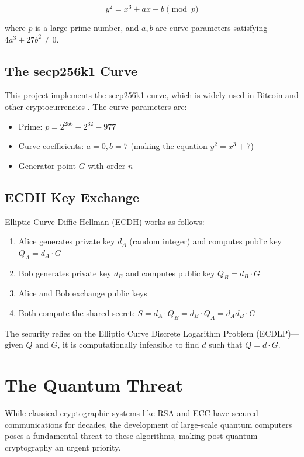 \[y^2 = x^3 + ax + b \pmod{p}\]

where $p$ is a large prime number, and $a, b$ are curve parameters satisfying $4a^3 + 27b^2 \neq 0$.

\subsection{The secp256k1 Curve}

This project implements the secp256k1 curve, which is widely used in Bitcoin and other cryptocurrencies \cite{SEC2}. The curve parameters are:
\begin{itemize}
\item Prime: $p = 2^{256} - 2^{32} - 977$
\item Curve coefficients: $a = 0, b = 7$ (making the equation $y^2 = x^3 + 7$)
\item Generator point $G$ with order $n$
\end{itemize}

\subsection{ECDH Key Exchange}

Elliptic Curve Diffie-Hellman (ECDH) works as follows:

\begin{enumerate}
\item Alice generates private key $d_A$ (random integer) and computes public key $Q_A = d_A \cdot G$
\item Bob generates private key $d_B$ and computes public key $Q_B = d_B \cdot G$  
\item Alice and Bob exchange public keys
\item Both compute the shared secret: $S = d_A \cdot Q_B = d_B \cdot Q_A = d_A d_B \cdot G$
\end{enumerate}

The security relies on the Elliptic Curve Discrete Logarithm Problem (ECDLP)—given $Q$ and $G$, it is computationally infeasible to find $d$ such that $Q = d \cdot G$.

\section{The Quantum Threat}

While classical cryptographic systems like RSA and ECC have secured communications for decades, the development of large-scale quantum computers poses a fundamental threat to these algorithms, making post-quantum cryptography an urgent priority.

